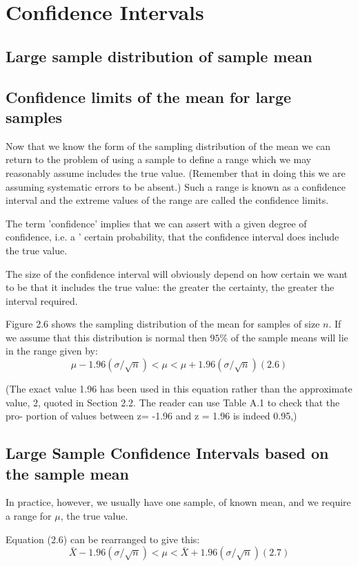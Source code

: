 
\section{Confidence Intervals}

\subsection{Large sample distribution of sample mean}

\subsection{Confidence limits of the mean for large samples}
Now that we know the form of the sampling distribution of the mean we can return to the problem of using a sample to define a range which we may reasonably assume includes the true value. (Remember that in doing this we are assuming systematic errors to be absent.) Such a range is known as a confidence interval and the extreme values of the range are called the confidence limits.

The term 'confidence' implies that we can assert with a given degree of confidence, i.e. a ' certain probability, that the confidence interval does include the true value.

The size of the confidence interval will obviously depend on how certain we want to be that it includes the true value: the greater the certainty, the greater the interval required.

Figure 2.6 shows the sampling distribution of the mean for samples of size $n$. If we assume that this distribution is normal then $95\%$  of the sample means will lie in the range given by:
\[ \mu - 1.96(\sigma/\sqrt{n}) < \mu < \mu + 1.96(\sigma/\sqrt{n}) (2.6)\]

(The exact value 1.96 has been used in this equation rather than the approximate
value, 2, quoted in Section 2.2. The reader can use Table A.1 to check that the pro-
portion of values between z= -1.96 and z = 1.96 is indeed 0.95,)

\subsection{Large Sample Confidence Intervals based on the sample mean}

In practice, however, we usually have one sample, of known mean, and we require a range for $\mu$, the true value.

Equation (2.6) can be rearranged to give this:
\[ \bar{X} - 1.96(\sigma/\sqrt{n}) < \mu < \bar{X} + 1.96(\sigma/\sqrt{n}) (2.7)\]

